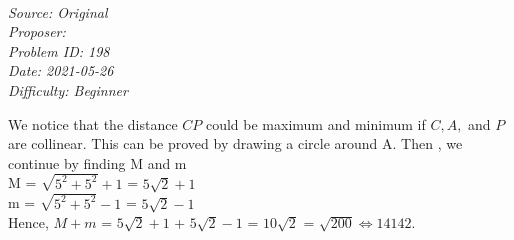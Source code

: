 \SSbreak\\
\emph{Source: Original}\\
\emph{Proposer: \Prandom}\\ %
\emph{Problem ID: 198}\\
\emph{Date: 2021-05-26}\\
\emph{Difficulty: Beginner}\\
\SSbreak

\bigskip

\begin{solution}\hfil\medskip

We notice that the distance $ CP $ could be maximum and minimum if $ C , A , $ and $ P $ are collinear. This can be proved by drawing a circle around A. Then , we continue by finding M and m \\
M = $ \sqrt{5^2 + 5^2} + 1 $ = $ 5 \sqrt{2} + 1 $ \\
m = $ \sqrt{5^2 + 5^2} - 1 $ = $ 5 \sqrt{2} - 1 $ \\
Hence, $ M + m $ = $ 5 \sqrt{2} + 1 $ + $ 5 \sqrt{2} - 1 $ = $ 10 \sqrt{2} $ = $ \sqrt{200}  \iff \boxed{14142}.$ \\
\end{solution}\bigskip
